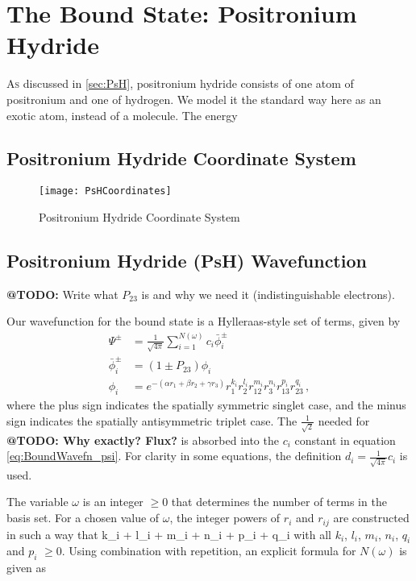 \documentclass[Dissertation.tex]{subfiles}
\begin{document}
\chapter{The Bound State: Positronium Hydride}
\label{chp:PsHBound}

\lettrine{A}{s} discussed in \cref{sec:PsH}, positronium hydride consists of one atom of positronium and one of hydrogen. We model it the standard way here as an exotic atom, instead of a molecule. The energy 

\section{Positronium Hydride Coordinate System}
\begin{figure}[!h]
	\centering
	\texttt{[image: PsHCoordinates]}
	\caption{Positronium Hydride Coordinate System}
	\label{fig:PsHCoords}
\end{figure}

\section{Positronium Hydride (PsH) Wavefunction}
\label{sec:BoundWavefn}

\textbf{@TODO:} Write what $P_{23}$ is and why we need it (indistinguishable electrons).

Our wavefunction for the bound state is a Hylleraas-style set of terms, given by
\begin{subequations}
\label{eq:BoundWavefn}
\begin{align}
\Psi^\pm &= \frac{1}{\sqrt{4\pi}} \sum_{i=1}^{N(\omega)} c_i \bar{\phi}_i^\pm \label{eq:BoundWavefn_psi} \\
\bar{\phi}_i^\pm &= (1 \pm P_{23}) \phi_i \label{eq:BoundWavefn_phibar} \\
\phi_i &= e^{-(\alpha r_1 + \beta r_2 + \gamma r_3)} r_1^{k_i} r_2^{l_i} r_{12}^{m_i} r_3^{n_i} r_{13}^{p_i} r_{23}^{q_i} \label{eq:BoundWavefn_phi} \, ,
\end{align}
\end{subequations}
\noindent where the plus sign indicates the spatially symmetric singlet case, and the minus sign indicates the spatially antisymmetric triplet case.  The $\frac{1}{\sqrt{2}}$ needed for \textbf{@TODO: Why exactly? Flux?} is absorbed into the $c_i$ constant in equation \ref{eq:BoundWavefn_psi}.  For clarity in some equations, the definition $d_i = \frac{1}{\sqrt{4\pi}} c_i$ is used.

The variable $\omega$ is an integer $\geq 0$ that determines the number of terms in the basis set.  For a chosen value of $\omega$, the integer powers of $r_i$ and $r_{ij}$ are constructed in such a way that
\beq
k_i + l_i + m_i + n_i + p_i + q_i \leq \omega
\eeq
\noindent with all $k_i$, $l_i$, $m_i$, $n_i$, $q_i$ and $p_i$ $\geq 0$.  Using combination with repetition, an explicit formula for $N(\omega)$ is given as
\end{document}
